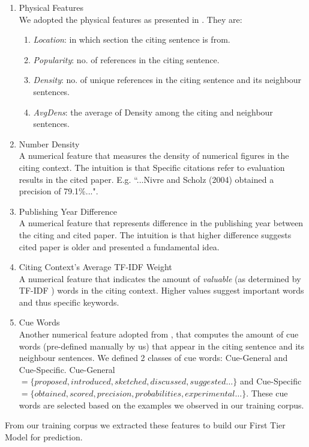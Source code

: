 \begin{enumerate}
\item Physical Features \\
We adopted the physical features as presented in \cite{dongensemble}. They are:
\begin{enumerate}
\item \textit{Location}: in which section the citing sentence is from.
\item \textit{Popularity}: no. of references in the citing sentence.
\item \textit{Density}: no. of unique references in the citing sentence and its neighbour sentences.
\item \textit{AvgDens}: the average of Density among the citing and neighbour sentences.
\end{enumerate}

\item Number Density \\
A numerical feature that measures the density of numerical figures in the citing context. The intuition is that Specific citations refer to evaluation results in the cited paper. E.g. ``...Nivre and Scholz (2004) obtained a precision of 79.1\%...".

\item Publishing Year Difference \\
A numerical feature that represents difference in the publishing year between the citing and cited paper. The intuition is that higher difference suggests cited paper is older and presented a fundamental idea.

\item Citing Context's Average TF-IDF Weight \\
A numerical feature that indicates the amount of \textit{valuable} (as determined by TF-IDF \cite{irtextbook}) words in the citing context. Higher values suggest important words and thus specific keywords.

\item Cue Words \\
Another numerical feature adopted from \cite{dongensemble}, that computes the amount of cue words (pre-defined manually by us) that appear in the citing sentence and its neighbour sentences. We defined 2 classes of cue words: Cue-General and Cue-Specific. Cue-General $ = \{proposed, introduced, sketched, discussed, suggested\ldots \}$ and Cue-Specific $ = \{obtained, scored, precision, probabilities, experimental\ldots \}$. These cue words are selected based on the examples we observed in our training corpus.
\end{enumerate}
From our training corpus we extracted these features to build our First Tier Model for prediction.

